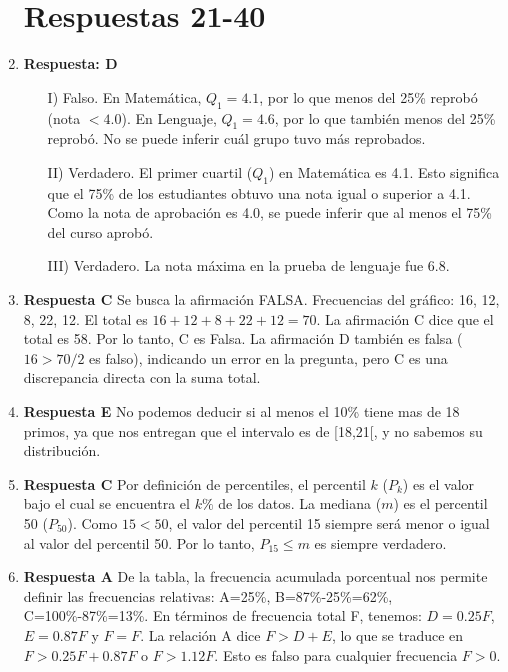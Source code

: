 \documentclass[11pt]{article}
\begin{document}
\begin{enumerate}
    \section{Respuestas 21-40}

    \item \textbf{Respuesta: D}
    \begin{itemize}
        \item[I)] Falso. En Matemática, $Q_1=4.1$, por lo que menos del 25\% reprobó (nota $<4.0$). En Lenguaje, $Q_1=4.6$, por lo que también menos del 25\% reprobó. No se puede inferir cuál grupo tuvo más reprobados.
        \item[II)] Verdadero. El primer cuartil ($Q_1$) en Matemática es 4.1. Esto significa que el 75\% de los estudiantes obtuvo una nota igual o superior a 4.1. Como la nota de aprobación es 4.0, se puede inferir que al menos el 75\% del curso aprobó.
        \item[III)] Verdadero. La nota máxima en la prueba de lenguaje fue 6.8.
    \end{itemize} %

    \item \textbf{Respuesta C} Se busca la afirmación FALSA. Frecuencias del gráfico: 16, 12, 8, 22, 12. El total es $16+12+8+22+12 = 70$. La afirmación C dice que el total es 58. Por lo tanto, C es Falsa. La afirmación D también es falsa ($16 > 70/2$ es falso), indicando un error en la pregunta, pero C es una discrepancia directa con la suma total. %

    \item \textbf{Respuesta E} No podemos deducir si al menos el 10\% tiene mas de 18 primos, ya que nos entregan que el intervalo es de [18,21[, y no sabemos su distribución.
    
    \item \textbf{Respuesta C} Por definición de percentiles, el percentil $k$ ($P_k$) es el valor bajo el cual se encuentra el $k\%$ de los datos. La mediana ($m$) es el percentil 50 ($P_{50}$). Como $15 < 50$, el valor del percentil 15 siempre será menor o igual al valor del percentil 50. Por lo tanto, $P_{15} \leq m$ es siempre verdadero. %
    
    \item \textbf{Respuesta A} De la tabla, la frecuencia acumulada porcentual nos permite definir las frecuencias relativas: A=25\%, B=87\%-25\%=62\%, C=100\%-87\%=13\%. En términos de frecuencia total F, tenemos: $D=0.25F$, $E=0.87F$ y $F=F$. La relación A dice $F > D+E$, lo que se traduce en $F > 0.25F + 0.87F$ o $F > 1.12F$. Esto es falso para cualquier frecuencia $F > 0$. %
    

\end{enumerate}
\end{document}
